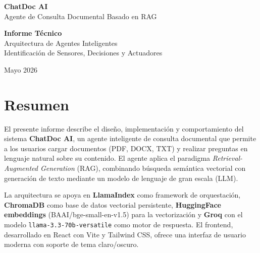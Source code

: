 \documentclass[12pt,a4paper]{article}
\begin{document}
\begin{titlepage}
  \centering
  \vspace*{2cm}

  {\Huge\bfseries\color{teal} ChatDoc AI}\\[0.4cm]
  {\Large\color{slate} Agente de Consulta Documental Basado en RAG}\\[2cm]

  \begin{mdframed}[linecolor=teal, linewidth=1.5pt, innertopmargin=10pt,
                   innerbottommargin=10pt, roundcorner=6pt]
    \centering
    \textbf{Informe Técnico}\\
    Arquitectura de Agentes Inteligentes\\[0.3cm]
    {\small Identificación de Sensores, Decisiones y Actuadores}
  \end{mdframed}

  \vfill
  {\large Mayo 2026}
\end{titlepage}

\tableofcontents
\newpage

\section{Resumen}

El presente informe describe el diseño, implementación y comportamiento del sistema \textbf{ChatDoc AI}, un agente inteligente de consulta documental que permite a los usuarios cargar documentos (PDF, DOCX, TXT) y realizar preguntas en lenguaje natural sobre su contenido. El agente aplica el paradigma \textit{Retrieval-Augmented Generation} (RAG), combinando búsqueda semántica vectorial con generación de texto mediante un modelo de lenguaje de gran escala (LLM).

La arquitectura se apoya en \textbf{LlamaIndex} como framework de orquestación, \textbf{ChromaDB} como base de datos vectorial persistente, \textbf{HuggingFace embeddings} (BAAI/bge-small-en-v1.5) para la vectorización y \textbf{Groq} con el modelo \texttt{llama-3.3-70b-versatile} como motor de respuesta. El frontend, desarrollado en React con Vite y Tailwind CSS, ofrece una interfaz de usuario moderna con soporte de tema claro/oscuro.
\end{document}
